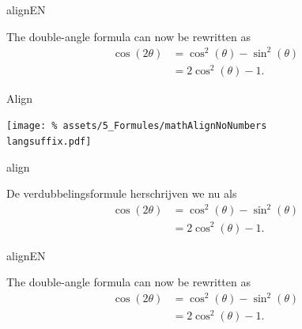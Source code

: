 \documentclass[presentatie.tex]{subfiles}
\begin{document}
\begin{saveblock}{alignEN}
	\begin{highlightblock}[gobble=8,linewidth=\textwidth,
		framexleftmargin=0.25em,xleftmargin=0.25em]
		The double-angle formula can now be rewritten as
		\begin{align*}
			\cos(2\theta) &= \cos^2(\theta) - \sin^2(\theta)\\
			&= 2\cos^2(\theta)-1.
		\end{align*}
	\end{highlightblock}
\end{saveblock}


\begin{frame}{Align}

	\texttt{[image: \%
		assets/5\_Formules/mathAlignNoNumbers\\langsuffix.pdf]}
\end{frame}



\begin{saveblock}{align}
	\begin{highlightblock}[gobble=8,linewidth=\textwidth,
		framexleftmargin=0.25em,xleftmargin=0.25em]
		De verdubbelingsformule herschrijven we nu als
		\begin{align*}
			\cos(2\theta) &= \cos^2(\theta) - \sin^2(\theta)\\
			&= 2\cos^2(\theta)-1. \tag{$ * $}
		\end{align*}
	\end{highlightblock}
\end{saveblock}

\begin{saveblock}{alignEN}
	\begin{highlightblock}[gobble=8,linewidth=\textwidth,
		framexleftmargin=0.25em,xleftmargin=0.25em]
		The double-angle formula can now be rewritten as
		\begin{align*}
			\cos(2\theta) &= \cos^2(\theta) - \sin^2(\theta)\\
			&= 2\cos^2(\theta)-1. \tag{$ * $}
		\end{align*}
	\end{highlightblock}
\end{saveblock}
\end{document}
